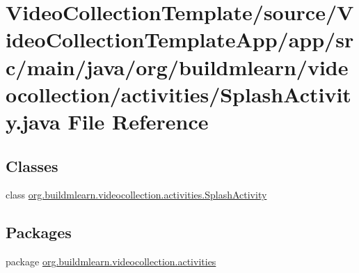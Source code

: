 \hypertarget{VideoCollectionTemplate_2source_2VideoCollectionTemplateApp_2app_2src_2main_2java_2org_2buildmle84db7cf67c6803c4f0512a31fa3b2aa3}{}\section{Video\+Collection\+Template/source/\+Video\+Collection\+Template\+App/app/src/main/java/org/buildmlearn/videocollection/activities/\+Splash\+Activity.java File Reference}
\label{VideoCollectionTemplate_2source_2VideoCollectionTemplateApp_2app_2src_2main_2java_2org_2buildmle84db7cf67c6803c4f0512a31fa3b2aa3}
\subsection*{Classes}
\begin{DoxyCompactItemize}
\item 
class \hyperlink{classorg_1_1buildmlearn_1_1videocollection_1_1activities_1_1SplashActivity}{org.\+buildmlearn.\+videocollection.\+activities.\+Splash\+Activity}
\end{DoxyCompactItemize}
\subsection*{Packages}
\begin{DoxyCompactItemize}
\item 
package \hyperlink{namespaceorg_1_1buildmlearn_1_1videocollection_1_1activities}{org.\+buildmlearn.\+videocollection.\+activities}
\end{DoxyCompactItemize}
